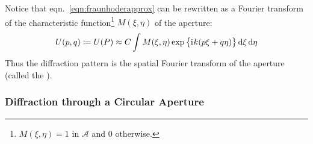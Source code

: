 Notice that eqn.~\eqref{eqn:fraunhoderapprox} can be rewritten as a Fourier transform of the characteristic function\footnote{\(M(\xi, \eta) = 1\) in \(\mathcal{A}\) and 0 otherwise.} \(M(\xi, \eta)\) of the aperture:
%
\begin{equation}
    U(p,q) \coloneqq U(P) \approx C \int M(\xi, \eta) \exp\left\{\iu k (p \xi + q \eta ) \right\} \dif \xi \dif \eta
\end{equation}
%
Thus the diffraction pattern is the spatial Fourier transform of the aperture (called the ).

\subsubsection{Diffraction through a Circular Aperture}\label{subsubsec:circularaperture}

